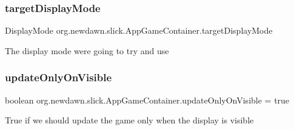 \subsubsection{\texorpdfstring{target\+Display\+Mode}{targetDisplayMode}}
{\footnotesize\ttfamily Display\+Mode org.\+newdawn.\+slick.\+App\+Game\+Container.\+target\+Display\+Mode\hspace{0.3cm}{\ttfamily [protected]}}

The display mode we\textquotesingle{}re going to try and use \mbox{\label{classorg_1_1newdawn_1_1slick_1_1_app_game_container_a8ed58465ae60f67d13fa69ea7929d3ef}} 
\subsubsection{\texorpdfstring{update\+Only\+On\+Visible}{updateOnlyOnVisible}}
{\footnotesize\ttfamily boolean org.\+newdawn.\+slick.\+App\+Game\+Container.\+update\+Only\+On\+Visible = true\hspace{0.3cm}{\ttfamily [protected]}}

True if we should update the game only when the display is visible 